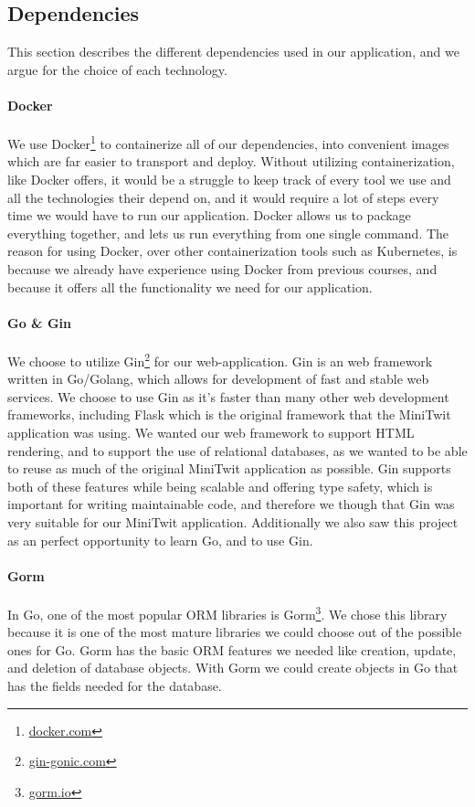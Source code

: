 \subsection{Dependencies} \label{sec:dependencies}
This section describes the different dependencies used in our application, and we argue for the choice of each technology.

\paragraph*{Docker}
We use Docker\footnote{\href{https://www.docker.com/}{docker.com}} to containerize all of our dependencies, into convenient images which are far easier to transport and deploy. Without utilizing containerization, like Docker offers, it would be a struggle to keep track of every tool we use and all the technologies their depend on, and it would require a lot of steps every time we would have to run our application. Docker allows us to package everything together, and lets us run everything from one single command. The reason for using Docker, over other containerization tools such as Kubernetes, is because we already have experience using Docker from previous courses, and because it offers all the functionality we need for our application.

\paragraph*{Go \& Gin}
We choose to utilize Gin\footnote{\href{https://gin-gonic.com/}{gin-gonic.com}} for our web-application. Gin is an web framework written in Go/Golang, which allows for development of fast and stable web services. We choose to use Gin as it's faster than many other web development frameworks, including Flask which is the original framework that the MiniTwit application was using. We wanted our web framework to support HTML rendering, and to support the use of relational databases, as we wanted to be able to reuse as much of the original MiniTwit application as possible. Gin supports both of these features while being scalable and offering type safety, which is important for writing maintainable code, and therefore we though that Gin was very suitable for our MiniTwit application. Additionally we also saw this project as an perfect opportunity to learn Go, and to use Gin.

\paragraph*{Gorm}
In Go, one of the most popular ORM libraries is Gorm\footnote{\href{https://gorm.io/}{gorm.io}}. We chose this library because it is one of the most mature libraries we could choose out of the possible ones for Go. Gorm has the basic ORM features we needed like creation, update, and deletion of database objects. With Gorm we could create objects in Go that has the fields needed for the database.


